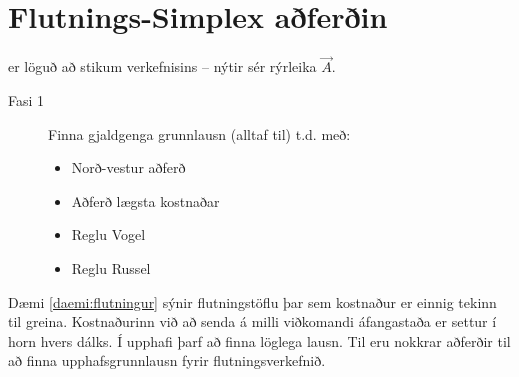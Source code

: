 \section{Flutnings-Simplex aðferðin}
 er löguð að stikum verkefnisins -- nýtir sér rýrleika $\vec{A}$.
\begin{description}
 \item[Fasi 1] Finna gjaldgenga grunnlausn  (alltaf til) t.d. með:
\begin{itemize}
 \item Norð-vestur aðferð
 \item Aðferð lægsta kostnaðar 
 \item Reglu Vogel
 \item Reglu Russel
\end{itemize}
\end{description}


Dæmi \ref{daemi:flutningur} sýnir flutningstöflu þar sem kostnaður er einnig tekinn til greina. Kostnaðurinn við að senda á milli viðkomandi áfangastaða er settur í horn hvers dálks. Í upphafi þarf að finna löglega lausn. Til eru nokkrar aðferðir til að finna upphafsgrunnlausn fyrir flutningsverkefnið.

